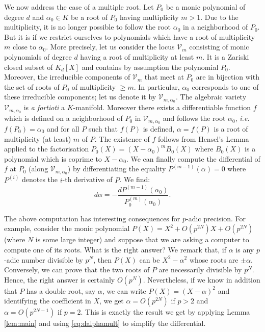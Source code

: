 \documentclass{sig-alternate}
\begin{document}
{We now address the case of a multiple root. Let $P_0$ be a monic 
polynomial of degree $d$ and $\alpha_0 \in K$ be a root of $P_0$ having 
multiplicity $m > 1$. Due to the multiplicity, it is no longer possible 
to follow the root $\alpha_0$ in a neighborhood of $P_0$. But it is if we 
restrict ourselves to polynomials which have a root of multiplicity $m$ 
close to $\alpha_0$. More precisely, let us consider the locus $\mathcal 
V_m$ consisting of monic polynomials of degree $d$ having a root of 
multiplicity at least $m$. It is a Zariski closed subset of $K_d[X]$ and
contains by assumption the polynomial $P_0$. 
Moreover, the irreducible components of $\mathcal V_m$ that meet at 
$P_0$ are in bijection with the set of roots of $P_0$ of multiplicity 
$\geq m$. In particular, $\alpha_0$ corresponds to one of these 
irreducible components; let us denote it by $\mathcal V_{m,\alpha_0}$. 
The algebraic variety $\mathcal V_{m,\alpha_0}$ is \emph{a fortioti} a
$K$-manifold. Moreover there exists a differentiable function $f$ which 
is defined on a neighborhood of $P_0$ in $\mathcal V_{m,\alpha_0}$ and 
follows the root $\alpha_0$, \emph{i.e.} $f(P_0) = \alpha_0$ and for all 
$P$ such that $f(P)$ is defined, $\alpha = f(P)$ is a root of 
multiplicity (at least) $m$ of $P$. The existence of $f$ follows from 
Hensel's Lemma applied to the factorisation $P_0(X) = (X-\alpha_0)^m 
B_0(X)$ where $B_0(X)$ is a polynomial which is coprime to $X - 
\alpha_0$. We can finally compute the differential of $f$ at $P_0$ 
(along $\mathcal V_{m,\alpha_0}$) by differentiating the equality
$P^{(m-1)}(\alpha) = 0$ where $P^{(i)}$ denotes the $i$-th derivative
of $P$. We find:
\begin{equation}
\label{eq:dalphamult}
d \alpha = - \frac{dP^{(m-1)}(\alpha_0)}{P_0^{(m)}(\alpha_0)}.
\end{equation}

The above computation has interesting consequences for $p$-adic 
precision. For example, consider the monic 
polynomial $P(X) = X^2 + O(p^{2N}) X + O(p^{2N})$ (where $N$ is some 
large integer) and suppose that we are asking a computer to compute one 
of its roots. What is the right answer? We remark that, if $\alpha$ is 
any $p$-adic number divisible by $p^N$, then $P(X)$ can be $X^2 - 
\alpha^2$ whose roots are $\pm \alpha$. Conversely, we can prove that 
the two roots of $P$ are necessarily divisible by $p^N$. Hence, the
right answer is certainly $O(p^N)$. Nevertheless, if we know in addition 
that $P$ has a double root, say $\alpha$, we can write $P(X) = (X - 
\alpha)^2$ and identifying the coefficient in $X$, we get $\alpha =
O(p^{2N})$ if $p > 2$ and $\alpha = O(p^{2N-1})$ if $p=2$.
This is exactly the result we get by applying Lemma \ref{lem:main} and
using \eqref{eq:dalphamult} to simplify the differential.

}
\end{document}
